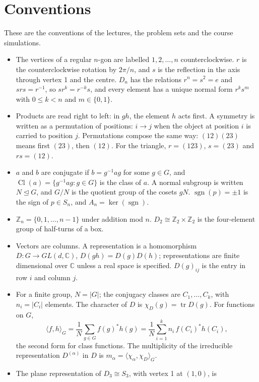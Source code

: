 \documentclass[11pt,a4paper]{article}
\newcommand{\Z}{\mathbb{Z}}
\newcommand{\C}{\mathbb{C}}
\DeclareMathOperator{\sgn}{sgn}
\DeclareMathOperator{\Cl}{Cl}
\DeclareMathOperator{\tr}{tr}
\newcommand{\nsub}{\trianglelefteq}
\begin{document}
\section*{\large Conventions}
These are the conventions of the lectures, the problem sets and the course simulations.
\begin{itemize}
  \item The vertices of a regular $n$-gon are labelled $1, 2, \dots, n$ counterclockwise. $r$ is the counterclockwise rotation by $2\pi/n$, and $s$ is the reflection in the axis through vertex 1 and the centre. $D_n$ has the relations $r^n = s^2 = e$ and $srs = r^{-1}$, so $s r^k = r^{-k} s$, and every element has a unique normal form $r^k s^m$ with $0 \le k < n$ and $m \in \{0, 1\}$.
  \item Products are read right to left: in $gh$, the element $h$ acts first. A symmetry is written as a permutation of positions: $i \to j$ when the object at position $i$ is carried to position $j$. Permutations compose the same way: $(12)(23)$ means first $(23)$, then $(12)$. For the triangle, $r = (123)$, $s = (23)$ and $rs = (12)$.
  \item $a$ and $b$ are conjugate if $b = g^{-1} a g$ for some $g \in G$, and $\Cl(a) = \{g^{-1} a g : g \in G\}$ is the class of $a$. A normal subgroup is written $N \nsub G$, and $G/N$ is the quotient group of the cosets $gN$. $\sgn(p) = \pm 1$ is the sign of $p \in S_n$, and $A_n = \ker(\sgn)$.
  \item $\Z_n = \{0, 1, \dots, n-1\}$ under addition mod $n$. $D_2 \cong \Z_2 \times \Z_2$ is the four-element group of half-turns of a box.
  \item Vectors are columns. A representation is a homomorphism $D\colon G \to GL(d, \C)$, $D(gh) = D(g)D(h)$; representations are finite dimensional over $\C$ unless a real space is specified. $D(g)_{ij}$ is the entry in row $i$ and column $j$.
  \item For a finite group, $N = |G|$; the conjugacy classes are $C_1, \dots, C_k$, with $n_i = |C_i|$ elements. The character of $D$ is $\chi_D(g) = \tr D(g)$. For functions on $G$,
  \[
    \langle f, h\rangle_G = \frac{1}{N}\sum_{g \in G} f(g)^* h(g) = \frac{1}{N}\sum_{i=1}^{k} n_i\, f(C_i)^* h(C_i),
  \]
  the second form for class functions. The multiplicity of the irreducible representation $D^{(\alpha)}$ in $D$ is $m_\alpha = \langle \chi_\alpha, \chi_D\rangle_G$.
  \item The plane representation of $D_3 \cong S_3$, with vertex 1 at $(1, 0)$, is

\end{itemize}
\end{document}
